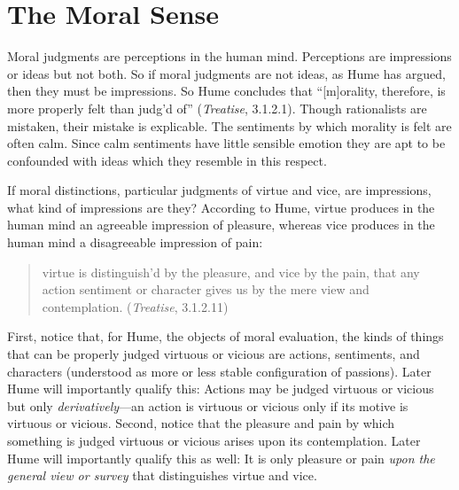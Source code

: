 
\section{The Moral Sense}\label{sec:the_moral_sense} %

Moral judgments are perceptions in the human mind. Perceptions are impressions or ideas but not both. So if moral judgments are not ideas, as Hume has argued, then they must be impressions. So Hume concludes that ``[m]orality, therefore, is more properly felt than judg'd of'' (\emph{Treatise}, 3.1.2.1). Though rationalists are mistaken, their mistake is explicable. The sentiments by which morality is felt are often calm. Since calm sentiments have little sensible emotion they are apt to be confounded with ideas which they resemble in this respect.

If moral distinctions, particular judgments of virtue and vice, are impressions, what kind of impressions are they? According to Hume, virtue produces in the human mind an agreeable impression of pleasure, whereas vice produces in the human mind a disagreeable impression of pain:

\begin{quote}
	virtue is distinguish'd by the pleasure, and vice by the pain, that any action sentiment or character gives us by the mere view and contemplation. (\emph{Treatise}, 3.1.2.11)
\end{quote}

First, notice that, for Hume, the objects of moral evaluation, the kinds of things that can be properly judged virtuous or vicious are actions, sentiments, and characters (understood as more or less stable configuration of passions). Later Hume will importantly qualify this: Actions may be judged virtuous or vicious but only \emph{derivatively}---an action is virtuous or vicious only if its motive is virtuous or vicious. Second, notice that the pleasure and pain by which something is judged virtuous or vicious arises upon its contemplation. Later Hume will importantly qualify this as well: It is only pleasure or pain \emph{upon the general view or survey} that distinguishes virtue and vice. \change

% 

